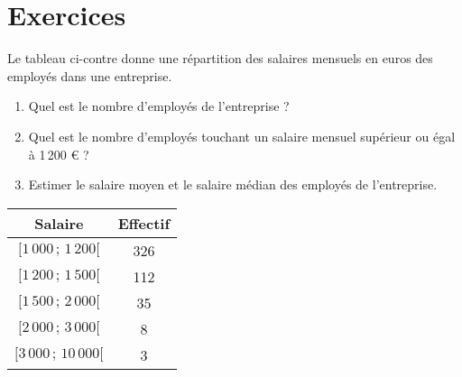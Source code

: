 \sautpage

\section{Exercices}


\begin{exo}
Le tableau ci-contre donne une répartition des salaires mensuels en euros des employés dans une entreprise.

\begin{enumerate}
	\item Quel est le nombre d'employés de l'entreprise ?
	\item Quel est le nombre d'employés touchant un salaire mensuel supérieur ou égal à 1\,200 \euro{} ?
	\item Estimer le salaire moyen et le salaire m\'edian des employés de l'entreprise.
\end{enumerate}

\begin{center}
\begin{tabular}{|*{2}{c|}}\hline
Salaire & Effectif \\ \hline
$[1\,000\,;\,1\,200[$ & 326 \\ \hline
$[1\,200\,;\,1\,500[$ & 112 \\ \hline
$[1\,500\,;\,2\,000[$ & 35 \\ \hline
$[2\,000\,;\,3\,000[$ & 8 \\ \hline
$[3\,000\,;\,10\,000[$& 3 \\ \hline
\end{tabular}
\end{center}

\end{exo}



